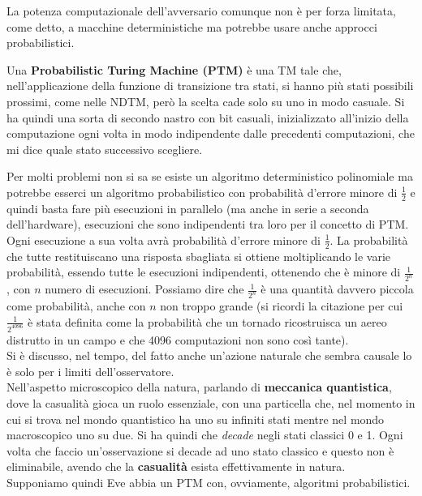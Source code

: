 \documentclass[a4paper,12pt, oneside]{book}
\begin{document}
La potenza computazionale dell'avversario comunque non è per forza limitata,
come detto, a macchine deterministiche ma potrebbe usare anche approcci
probabilistici.
\begin{definizione}
  Una \textbf{Probabilistic Turing Machine (PTM)} è una TM tale che,
  nell'applicazione della funzione di transizione tra stati, si hanno più stati
  possibili prossimi, come nelle NDTM, però la scelta cade solo su uno in modo
  casuale. Si ha quindi una sorta di secondo nastro con bit casuali,
  inizializzato all'inizio della computazione ogni volta in modo indipendente
  dalle precedenti computazioni, che mi dice quale stato successivo scegliere.
\end{definizione}
Per molti problemi non si sa se esiste un algoritmo deterministico polinomiale
ma potrebbe esserci un algoritmo probabilistico con probabilità d'errore minore
di $\frac{1}{2}$ e quindi basta fare più esecuzioni in parallelo (ma anche in
serie a seconda dell'hardware), esecuzioni che sono indipendenti tra loro per
il concetto di PTM. Ogni esecuzione a sua volta avrà probabilità d'errore minore
di $\frac{1}{2}$. La probabilità che tutte restituiscano una risposta sbagliata
si ottiene moltiplicando le varie probabilità, essendo tutte le esecuzioni
indipendenti, ottenendo che è minore di $\frac{1}{2^n}$, con $n$ numero di
esecuzioni. Possiamo dire che $\frac{1}{2^n}$ è una quantità davvero piccola
come probabilità, anche con $n$ non troppo grande (si ricordi la citazione per
cui $\frac{1}{2^{4096}}$ è stata definita come la probabilità che un tornado
ricostruisca un aereo distrutto in un campo e che 4096 computazioni non sono
così tante).\\
Si è discusso, nel tempo, del fatto anche un'azione naturale che sembra causale
lo è solo per i limiti dell'osservatore.\\
Nell'aspetto microscopico della natura, parlando di \textbf{meccanica
  quantistica}, dove la casualità gioca un ruolo essenziale, con una particella
che, nel momento in cui si trova nel mondo quantistico ha uno su infiniti stati
mentre nel mondo macroscopico uno su due. Si ha quindi che \textit{decade} negli
stati classici 0 e 1. Ogni volta che faccio un'osservazione si decade ad uno
stato classico e questo non è eliminabile, avendo che la \textbf{casualità}
esista effettivamente in natura.\\
Supponiamo quindi Eve abbia un PTM con, ovviamente, algoritmi probabilistici.
\end{document}
